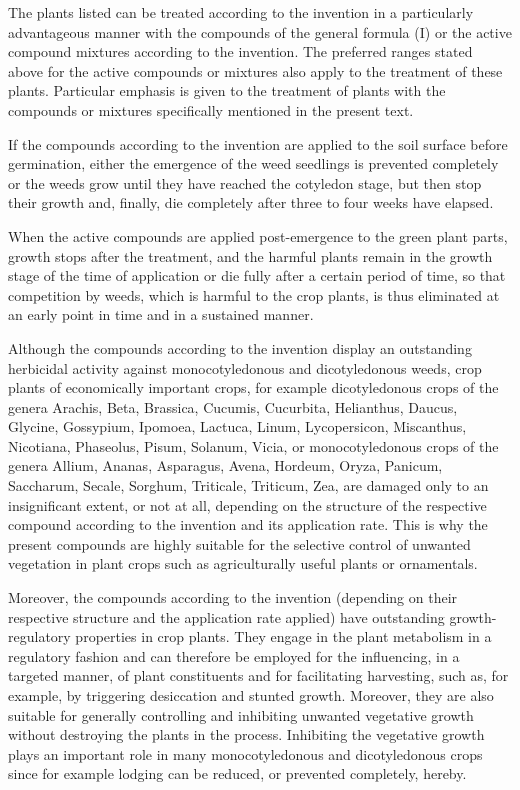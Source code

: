 \documentclass[11pt,a4paper]{article}
\begin{document}
The plants listed can be treated according to the invention in a particularly advantageous manner with the compounds of the general formula (I) or the active compound mixtures according to the invention. The preferred ranges stated above for the active compounds or mixtures also apply to the treatment of these plants. Particular emphasis is given to the treatment of plants with the compounds or mixtures specifically mentioned in the present text.

If the compounds according to the invention are applied to the soil surface before germination, either the emergence of the weed seedlings is prevented completely or the weeds grow until they have reached the cotyledon stage, but then stop their growth and, finally, die completely after three to four weeks have elapsed.

When the active compounds are applied post-emergence to the green plant parts, growth stops after the treatment, and the harmful plants remain in the growth stage of the time of application or die fully after a certain period of time, so that competition by weeds, which is harmful to the crop plants, is thus eliminated at an early point in time and in a sustained manner.

Although the compounds according to the invention display an outstanding herbicidal activity against monocotyledonous and dicotyledonous weeds, crop plants of economically important crops, for example dicotyledonous crops of the genera Arachis, Beta, Brassica, Cucumis, Cucurbita, Helianthus, Daucus, Glycine, Gossypium, Ipomoea, Lactuca, Linum, Lycopersicon, Miscanthus, Nicotiana, Phaseolus, Pisum, Solanum, Vicia, or monocotyledonous crops of the genera Allium, Ananas, Asparagus, Avena, Hordeum, Oryza, Panicum, Saccharum, Secale, Sorghum, Triticale, Triticum, Zea, are damaged only to an insignificant extent, or not at all, depending on the structure of the respective compound according to the invention and its application rate. This is why the present compounds are highly suitable for the selective control of unwanted vegetation in plant crops such as agriculturally useful plants or ornamentals.

Moreover, the compounds according to the invention (depending on their respective structure and the application rate applied) have outstanding growth-regulatory properties in crop plants. They engage in the plant metabolism in a regulatory fashion and can therefore be employed for the influencing, in a targeted manner, of plant constituents and for facilitating harvesting, such as, for example, by triggering desiccation and stunted growth. Moreover, they are also suitable for generally controlling and inhibiting unwanted vegetative growth without destroying the plants in the process. Inhibiting the vegetative growth plays an important role in many monocotyledonous and dicotyledonous crops since for example lodging can be reduced, or prevented completely, hereby.
\end{document}
